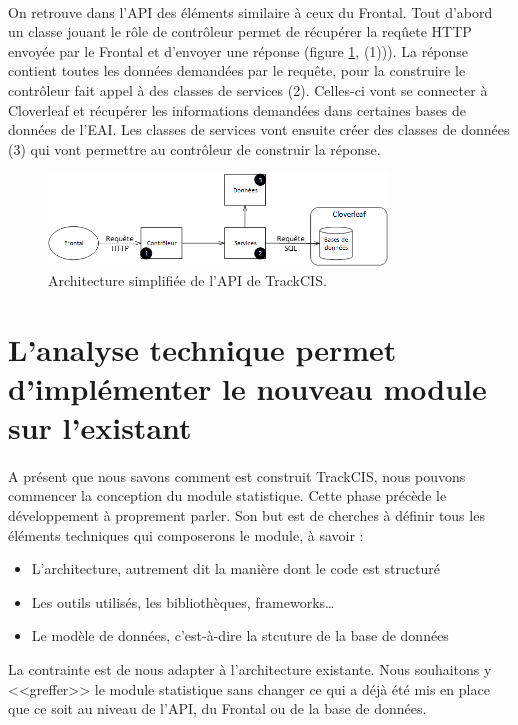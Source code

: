 			\paragraph{}
			On retrouve dans l'API des éléments similaire à ceux du Frontal. Tout d'abord
			un classe jouant le rôle de contrôleur permet de récupérer la reqûete HTTP
			envoyée par le Frontal et d'envoyer une réponse (figure
			\ref{archi_actuelle_api}, (1))). La réponse contient toutes les données
			demandées par le requête, pour la construire le contrôleur fait appel à des
			classes de services (2). Celles-ci vont se connecter à Cloverleaf et
			récupérer les informations demandées dans certaines bases de données de l'EAI. Les
			classes de services vont ensuite créer des classes de données (3) qui vont
			permettre au contrôleur de construir la réponse.
			\begin{figure}[H]
				\centering
				\includegraphics[width=9cm]{../img/part3/archi_actuelle_api.png}
				\caption{\label{archi_actuelle_api} Architecture simplifiée de l'API de
				TrackCIS.}
			\end{figure}
	
	\section{L'analyse technique permet d'implémenter le nouveau module sur
	l'existant}
		\paragraph{}
		A présent que nous savons comment est construit TrackCIS, nous pouvons
		commencer la conception du module statistique. Cette phase précède le
		développement à proprement parler. Son but est de cherches à définir tous les
		éléments techniques qui composerons le module, à savoir :
		\begin{itemize}
		  \item L'architecture, autrement dit la manière dont le code est structuré
		  \item Les outils utilisés, les bibliothèques, frameworks\ldots
		  \item Le modèle de données, c'est-à-dire la stcuture de la base de données
		\end{itemize}
		La contrainte est de nous adapter à l'architecture existante. Nous souhaitons
		y <<greffer>> le module statistique sans changer ce qui a déjà été mis en
		place que ce soit au niveau de l'API, du Frontal ou de la base de données.
		
